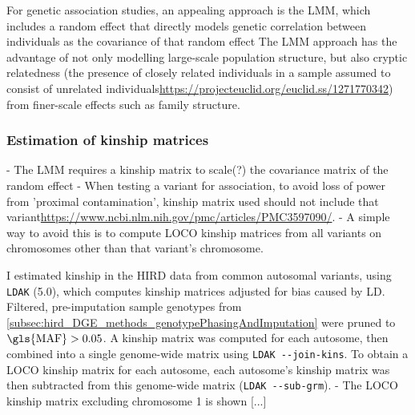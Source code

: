 %
For genetic association studies, an appealing approach is the \gls{LMM}, which includes a random effect that directly models genetic correlation between individuals as the covariance of that random effect\autocite{price2010NewApproachesPopulation, eu-ahsunthornwattana2014ComparisonMethodsAccount, golan2018MixedModelsCaseControl}
The \gls{LMM} approach has the advantage of not only modelling large-scale population structure, but also cryptic relatedness (the presence of closely related individuals in a sample assumed to consist of unrelated individuals\url{https://projecteuclid.org/euclid.ss/1271770342}) from finer-scale effects such as family structure\autocite{golan2018MixedModelsCaseControl}.

\subsubsection{Estimation of kinship matrices}


- The LMM requires a kinship matrix to scale(?) the covariance matrix of the random effect
- When testing a variant for association, to avoid loss of power from 'proximal contamination', kinship matrix used should not include that variant\url{https://www.ncbi.nlm.nih.gov/pmc/articles/PMC3597090/}.
- A simple way to avoid this is to compute \gls{LOCO} kinship matrices from all variants on chromosomes other than that variant's chromosome\autocite{lippert2011FaSTLinearMixed}.

I estimated kinship in the \gls{HIRD} data from common autosomal variants, using \texttt{LDAK} (5.0), which computes kinship matrices adjusted for bias caused by \gls{LD}\autocite{speed2012ImprovedHeritabilityEstimation}.
Filtered, pre-imputation sample genotypes from \autoref{subsec:hird_DGE_methods_genotypePhasingAndImputation} were pruned to $\text{\gls{MAF}} > 0.05$.
A kinship matrix was computed for each autosome, then combined into a single genome-wide matrix using \texttt{LDAK -{}-join-kins}.
To obtain a \gls{LOCO} kinship matrix for each autosome, each autosome's kinship matrix was then subtracted from this genome-wide matrix (\texttt{LDAK -{}-sub-grm}).
- The \gls{LOCO} kinship matrix excluding chromosome 1 is shown [...]

